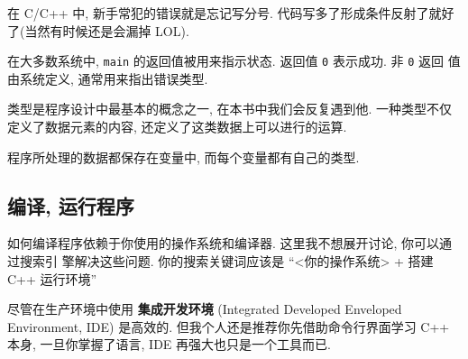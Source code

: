 \documentclass[lang=cn]{elegantbook}
\begin{document}
\begin{note}
在 C/C++ 中, 新手常犯的错误就是忘记写分号. 代码写多了形成条件反射了就好了(当然有时候还是会漏掉 LOL).
\end{note}

\vspace*{1\baselineskip}

在大多数系统中, \texttt{main} 的返回值被用来指示状态. 返回值 \texttt{0} 表示成功. 非 \texttt{0} 返回
值由系统定义, 通常用来指出错误类型.

\vspace*{1\baselineskip}

\begin{definition}[类型]
类型是程序设计中最基本的概念之一, 在本书中我们会反复遇到他. 一种类型不仅定义了数据元素的内容, 还定义了这类数据上可以进行的运算.

程序所处理的数据都保存在变量中, 而每个变量都有自己的类型.
\end{definition}

\subsection{编译, 运行程序}
\label{sec:orgcde4eb9}

如何编译程序依赖于你使用的操作系统和编译器. 这里我不想展开讨论, 你可以通过搜索引
擎解决这些问题. 你的搜索关键词应该是 ``<你的操作系统> + 搭建 C++ 运行环境''

尽管在生产环境中使用 \textbf{集成开发环境} (Integrated Developed Enveloped Environment,
IDE) 是高效的. 但我个人还是推荐你先借助命令行界面学习 C++ 本身, 一旦你掌握了语言,
IDE 再强大也只是一个工具而已.
\end{document}
